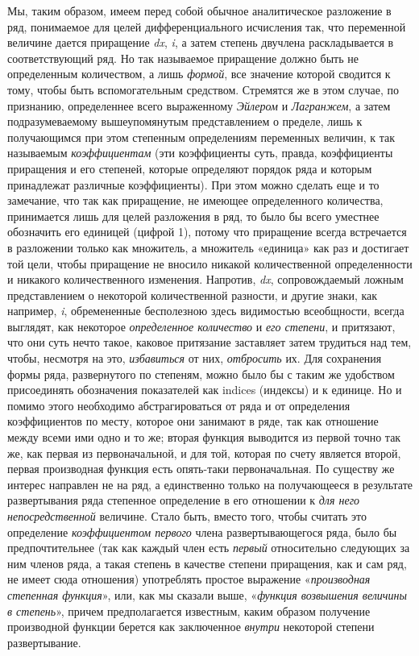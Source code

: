 Мы, таким образом, имеем перед собой обычное аналитическое разложение в ряд,
понимаемое для целей дифференциального исчисления так, что переменной
величине дается приращение {\em dx},
{\em i}, а затем степень двучлена раскладывается в
соответствующий ряд. Но так называемое приращение должно быть не
определенным количеством, а лишь {\em формой}, все
значение которой сводится к тому, чтобы быть вспомогательным средством.
Стремятся же в этом случае, по признанию, определеннее всего выраженному
{\em Эйлером} и {\em Лагранжем}, а
затем подразумеваемому вышеупомянутым представлением о пределе, лишь к
получающимся при этом степенным определениям переменных величин, к так
называемым {\em коэффициентам} (эти коэффициенты суть,
правда, коэффициенты приращения и его степеней, которые определяют порядок
ряда и которым принадлежат различные коэффициенты). При этом можно сделать
еще и то замечание, что так как приращение, не имеющее определенного
количества, принимается лишь для целей разложения в ряд, то было бы всего
уместнее обозначить его единицей (цифрой 1), потому что приращение всегда
встречается в разложении только как множитель, а множитель «единица» как
раз и достигает той цели, чтобы приращение не вносило никакой
количественной определенности и никакого количественного изменения.
Напротив, {\em dx}, сопровождаемый ложным
представлением о некоторой количественной разности, и другие знаки, как
например, {\em i}, обремененные бесполезною здесь
видимостью всеобщности, всегда выглядят, как некоторое
{\em определенное количество} и
{\em его степени}, и притязают, что они суть нечто
такое, каковое притязание заставляет затем трудиться над тем, чтобы,
несмотря на это, {\em избавиться} от них,
{\em отбросить} их. Для сохранения формы ряда,
развернутого по степеням, можно было бы с таким же удобством присоединять
обозначения показателей как indices (индексы) и к единице. Но и помимо
этого необходимо абстрагироваться от ряда и от определения коэффициентов по
месту, которое они занимают в ряде, так как отношение между всеми ими одно
и то же; вторая функция выводится из первой точно так же, как первая из
первоначальной, и для той, которая по счету является второй, первая
производная функция есть опять-таки первоначальная. По существу же интерес
направлен не на ряд, а единственно только на получающееся в результате
развертывания ряда степенное определение в его отношении к
{\em для него непосредственной} величине. Стало быть,
вместо того, чтобы считать это определение
{\em коэффициентом первого} члена развертывающегося
ряда, было бы предпочтительнее (так как каждый член есть
{\em первый} относительно следующих за ним членов ряда,
а такая степень в качестве степени приращения, как и сам ряд, не имеет сюда
отношения) употреблять простое выражение
«{\em производная степенная функция}», или, как мы
сказали выше, «{\em функция возвышения величины в
степень}», причем предполагается известным, каким образом получение
производной функции берется как заключенное
{\em внутри} некоторой степени развертывание.

